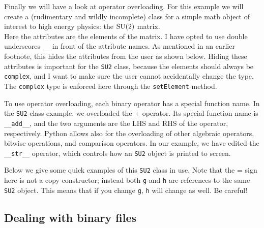 



Finally we will have a look at operator overloading. For this example we
will create a (rudimentary and wildly incomplete) class for a simple math 
object of interest to high energy physics: the $\operatorname{SU}(2)$ matrix.\\



Here the attributes are the elements of the matrix. 
I have opted to use double underscores \texttt{\_\_} in front of
the attribute names. As mentioned in an earlier footnote, this hides the
attributes from the user as shown below.
Hiding these attributes is important for the \texttt{SU2} class, because the
elements should always be \texttt{complex}, and I want to make sure the
user cannot accidentally change the type. The \texttt{complex} type is
enforced here through the \texttt{setElement} method.




To use operator overloading, each binary operator has a special function name.
In the \texttt{SU2} class example, we overloaded the + operator. Its special
function name is \texttt{\_\_add\_\_}, and the two arguments are the LHS and
RHS of the operator, respectively. Python allows also for the overloading
of other algebraic operators, bitwise operations, and comparison operators.
In our example, we have edited the \texttt{\_\_str\_\_} operator, which
controls how an \texttt{SU2} object is printed to screen.

Below we give some quick examples of this \texttt{SU2} class in use. Note that
the = sign here is not a copy constructor; instead both \texttt{g} and
\texttt{h} are references to the same \texttt{SU2} object. This means that
if you change \texttt{g}, \texttt{h} will change as well. Be careful!\\ 





\subsection{Dealing with binary files}

